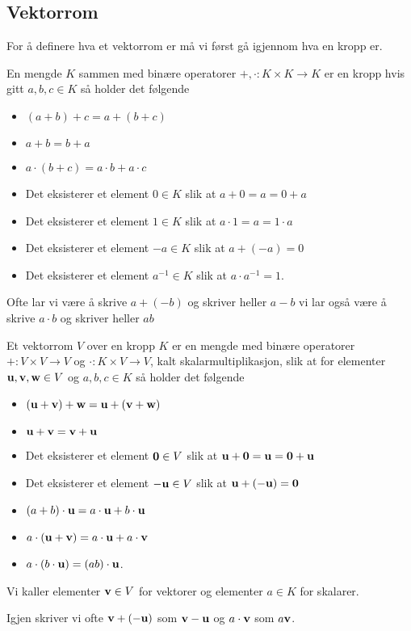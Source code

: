 \subsection{Vektorrom}\label{Sec:Vekt}
For å definere hva et vektorrom er må vi først gå igjennom hva en kropp er.

\begin{definisjon}\label{Def:Kropp}
   En mengde $K$ sammen med binære operatorer $+,\cdot: K\times K\to K$ er en kropp hvis gitt $a,b,c\in K$ så holder det følgende
   \begin{itemize}
    \item $(a+b)+c = a+(b+c)$
    \item $a+b = b+a$
    \item $a\cdot(b+c)=a\cdot b + a\cdot c$
    \item Det eksisterer et element $0\in K$ slik at $a+0=a=0+a$
    \item Det eksisterer et element $1\in K$ slik at $a\cdot 1 = a = 1\cdot a$
    \item Det eksisterer et element $-a\in K$ slik at $a+ (-a) = 0$
    \item Det eksisterer et element $a^{-1}\in K$ slik at $a\cdot a^{-1}=1$.
   \end{itemize} 
\end{definisjon}
Ofte lar vi være å skrive $a+(-b)$ og skriver heller $a-b$ vi lar også være å skrive $a\cdot b$ og skriver heller $ab$

\begin{definisjon}\label{Def:Vektrom}
    Et vektorrom $V$ over en kropp $K$ er en mengde med binære operatorer $+:V\times V\to V$ og $\cdot: K\times
V\to V$, kalt skalarmultiplikasjon, slik at for elementer $\textbf{u},\textbf{v},\textbf{w}\in V$ og $a,b,c\in K$ så holder det følgende
    \begin{itemize}
    \item $(\textbf{u}+\textbf{v})+\textbf{w} = \textbf{u}+(\textbf{v}+\textbf{w})$
    \item $\textbf{u}+\textbf{v}=\textbf{v}+\textbf{u}$
    \item Det eksisterer et element $\textbf{0}\in V$ slik at $\textbf{u}+\textbf{0}=\textbf{u}=\textbf{0}+\textbf{u}$
    \item Det eksisterer et element $-\textbf{u}\in V$ slik at $\textbf{u}+(-\textbf{u})=\textbf{0}$
    \item $(a+b)\cdot \textbf{u} = a\cdot \textbf{u} + b\cdot \textbf{u}$
    \item $a\cdot(\textbf{u}+\textbf{v}) = a\cdot \textbf{u} + a\cdot \textbf{v}$
    \item $a\cdot (b\cdot \textbf{u}) = (ab)\cdot \textbf{u}$.
    \end{itemize}
    Vi kaller elementer $\textbf{v}\in V$ for vektorer og elementer $a\in K$ for skalarer.
\end{definisjon}
Igjen skriver vi ofte $\textbf{v}+(-\textbf{u})$ som $\textbf{v}-\textbf{u}$ og $a\cdot \textbf{v}$ som $a\textbf{v}$.

